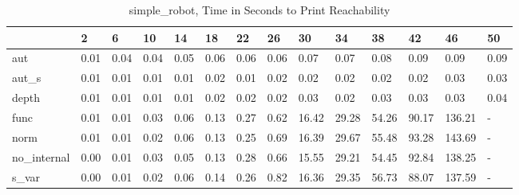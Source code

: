 \begin{table}
\caption{simple_robot, Time in Seconds to Print Reachability}
\label{simple_robot_states_time}
\begin{tabular}{llllllllllllll}
\toprule
 & 2 & 6 & 10 & 14 & 18 & 22 & 26 & 30 & 34 & 38 & 42 & 46 & 50 \\
\midrule
aut & 0.01 & 0.04 & 0.04 & 0.05 & 0.06 & 0.06 & 0.06 & 0.07 & 0.07 & 0.08 & 0.09 & 0.09 & 0.09 \\
aut_s & 0.01 & 0.01 & 0.01 & 0.01 & 0.02 & 0.01 & 0.02 & 0.02 & 0.02 & 0.02 & 0.02 & 0.03 & 0.03 \\
depth & 0.01 & 0.01 & 0.01 & 0.01 & 0.02 & 0.02 & 0.02 & 0.03 & 0.02 & 0.03 & 0.03 & 0.03 & 0.04 \\
func & 0.01 & 0.01 & 0.03 & 0.06 & 0.13 & 0.27 & 0.62 & 16.42 & 29.28 & 54.26 & 90.17 & 136.21 & - \\
norm & 0.01 & 0.01 & 0.02 & 0.06 & 0.13 & 0.25 & 0.69 & 16.39 & 29.67 & 55.48 & 93.28 & 143.69 & - \\
no_internal & 0.00 & 0.01 & 0.03 & 0.05 & 0.13 & 0.28 & 0.66 & 15.55 & 29.21 & 54.45 & 92.84 & 138.25 & - \\
s_var & 0.00 & 0.01 & 0.02 & 0.06 & 0.14 & 0.26 & 0.82 & 16.36 & 29.35 & 56.73 & 88.07 & 137.59 & - \\
\bottomrule
\end{tabular}
\end{table}
